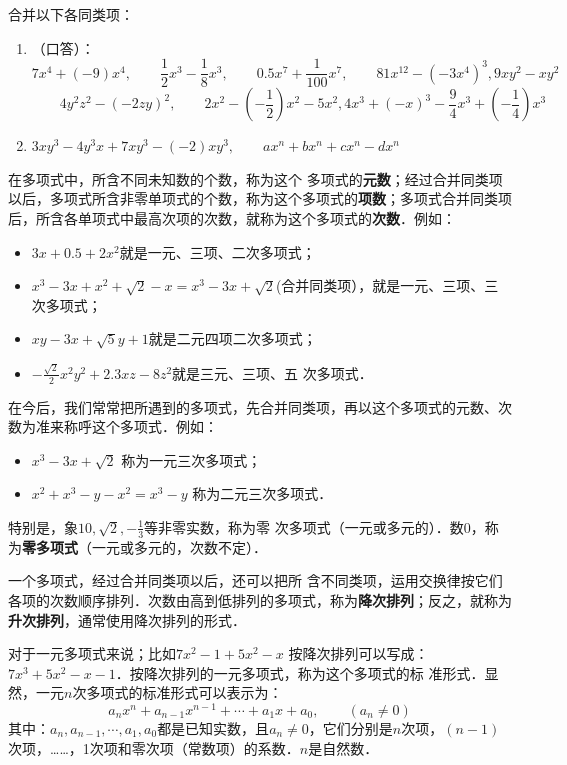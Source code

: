 \begin{ex}
    合并以下各同类项：
\begin{enumerate}
    \item （口答）：
    \[7x^4+(-9)x^4,\qquad \frac{1}{2}x^3-\frac{1}{8}x^3,\qquad 0.5x^7+\frac{1}{100}x^7,\qquad 81x^{12}-(-3x^4)^3 ,9xy^2-xy^2 \]
    \[\qquad 4y^2z^2-(-2zy)^2,\qquad 2x^2-\left(-\frac{1}{2}\right)x^2-5x^2, 4x^3+(-x)^3-\frac{9}{4}x^3+\left(-\frac{1}{4}\right)x^3 \]
    \item $3xy^3-4y^3x+7xy^3-(-2)xy^3,\qquad ax^n+bx^n+cx^n-dx^n$
\end{enumerate}
\end{ex}

在多项式中，所含不同未知数的个数，称为这个
多项式的\textbf{元数}；经过合并同类项以后，多项式所含非零单项式的个数，称为这个多项式的\textbf{项数}；多项式合并同类项后，所含各单项式中最高次项的次数，就称为这个多项式的\textbf{次数}．例如：
\begin{itemize}
    \item $3x+0.5+2x^2$就是一元、三项、二次多项式；
    \item $x^3-3x+x^2+\sqrt{2}-x=x^3-3x+\sqrt{2}$(合并同类项），就是一元、三项、三次多项式；
    \item $xy-3x+\sqrt{5}y+1$就是二元四项二次多项式；
    \item $-\frac{\sqrt{2}}{2}x^2y^2 +2.3xz-8z^2$就是三元、三项、五
次多项式．
\end{itemize}

在今后，我们常常把所遇到的多项式，先合并同类项，再以这个多项式的元数、次数为准来称呼这个多项式．例如：
\begin{itemize}
    \item $x^3-3x+\sqrt{2}$ 称为一元三次多项式；
    \item $x^2+x^3-y-x^2=x^3-y$ 称为二元三次多项式．
\end{itemize}
特别是，象$10,\sqrt{2},-\frac{1}{3}$等非零实数，称为零
次多项式（一元或多元的）．数0，称为\textbf{零多项式}（一元或多元的，次数不定）．

一个多项式，经过合并同类项以后，还可以把所
含不同类项，运用交换律按它们各项的次数顺序排列．次数由高到低排列的多项式，称为\textbf{降次排列}；反之，就称为\textbf{升次排列}，通常使用降次排列的形式．

对于一元多项式来说；比如$7x^2-1+5x^2-x$ 按降次排列可以写成：
$7x^3+5x^2-x-1$．按降次排列的一元多项式，称为这个多项式的标
准形式．显然，一元$n$次多项式的标准形式可以表示为：
\[a_nx^n+a_{n-1}x^{n-1}+\cdots +a_1x+a_0,\qquad (a_n\ne 0) \]
其中：$a_n,a_{n-1},\cdots,a_1,a_0$都是已知实数，且$a_n\ne 0$，它们分别是$n$次项，$(n-1)$次项，……，1次项和零次项（常数项）的系数．$n$是自然数．


